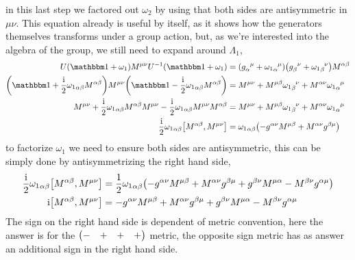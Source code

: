 in this last step we factored out $\omega_2$ by using that both sides are antisymmetric in $\mu\nu$. This equation already is useful by itself, as it shows how the generators themselves transforms under a group 
action, but, as we're interested into the algebra of the group, we still need to expand around $\Lambda_1$,
\begin{align}
    U\qty(\mathbbm 1+\omega_1)M^{\mu\nu}U^{-1}\qty(\mathbbm 1+\omega_1) &=\qty(\tensor{g}{_\alpha^\mu}+\tensor{{\omega_1}}{_\alpha^\mu})\qty(\tensor{g}{_\beta^\nu}+\tensor{{\omega_1}}{_\beta^\nu})M^{\alpha\beta}\\
    \qty(\mathbbm 1 +\frac\im 2{\omega_1}_{\alpha\beta}M^{\alpha\beta})M^{\mu\nu}\qty(\mathbbm 1 -\frac\im 2{\omega_1}_{\alpha\beta}M^{\alpha\beta})&=M^{\mu\nu}+M^{\mu\beta}\tensor{{\omega_1}}{_\beta^\nu}+M^{\alpha\nu}\tensor{{\omega_1}}{_\alpha^\mu}\\
    M^{\mu\nu}+\frac\im 2{\omega_1}_{\alpha\beta}M^{\alpha\beta}M^{\mu\nu} -\frac\im 2{\omega_1}_{\alpha\beta}M^{\mu\nu}M^{\alpha\beta}&=M^{\mu\nu}+M^{\mu\beta}\tensor{{\omega_1}}{_\beta^\nu}+M^{\alpha\nu}\tensor{{\omega_1}}{_\alpha^\mu}\\
    \frac\im 2{\omega_1}_{\alpha\beta}\comm{M^{\alpha\beta}}{M^{\mu\nu}}&={\omega_1}_{\alpha\beta}\qty(-\tensor{g}{^\alpha^\nu}M^{\mu\beta}+M^{\alpha\nu}g^{\beta\mu})
\end{align}
to factorize $\omega_1$ we need to ensure both sides are antisymmetric, this can be simply done by antisymmetrizing the right hand side,
\begin{align}
    \frac\im 2{\omega_1}_{\alpha\beta}\comm{M^{\alpha\beta}}{M^{\mu\nu}}&=\frac12{\omega_1}_{\alpha\beta}\qty(-\tensor{g}{^\alpha^\nu}M^{\mu\beta}+M^{\alpha\nu}g^{\beta\mu}+\tensor{g}{^\beta^\nu}M^{\mu\alpha}-M^{\beta\nu}g^{\alpha\mu})\\
    \im \comm{M^{\alpha\beta}}{M^{\mu\nu}}&=-\tensor{g}{^\alpha^\nu}M^{\mu\beta}+M^{\alpha\nu}g^{\beta\mu}+\tensor{g}{^\beta^\nu}M^{\mu\alpha}-M^{\beta\nu}g^{\alpha\mu}
\end{align}
The sign on the right hand side is dependent of metric convention, here the answer is for the $\mqty(-&+&+&+)$ metric, the opposite sign metric has as answer an additional sign in the right hand side.

\probitem{}

